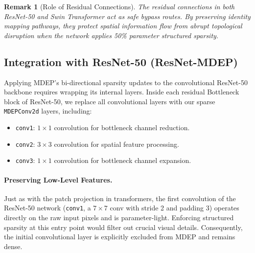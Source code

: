 \documentclass[11pt, a4paper]{article}
\newtheorem{remark}{Remark}
\begin{document}
\begin{remark}[Role of Residual Connections]
The residual connections in both ResNet-50 and Swin Transformer act as safe bypass routes. By preserving identity mapping pathways, they protect spatial information flow from abrupt topological disruption when the network applies 50\% parameter structured sparsity.
\end{remark}

\subsection{Integration with ResNet-50 (ResNet-MDEP)}\label{subsec:resnet}

Applying MDEP's bi-directional sparsity updates to the convolutional ResNet-50 backbone requires wrapping its internal layers. Inside each residual Bottleneck block of ResNet-50, we replace all convolutional layers with our sparse \texttt{MDEPConv2d} layers, including:
\begin{itemize}
    \item \texttt{conv1}: $1 \times 1$ convolution for bottleneck channel reduction.
    \item \texttt{conv2}: $3 \times 3$ convolution for spatial feature processing.
    \item \texttt{conv3}: $1 \times 1$ convolution for bottleneck channel expansion.
\end{itemize}

\paragraph{Preserving Low-Level Features.}
Just as with the patch projection in transformers, the first convolution of the ResNet-50 network (\texttt{conv1}, a $7 \times 7$ conv with stride 2 and padding 3) operates directly on the raw input pixels and is parameter-light. Enforcing structured sparsity at this entry point would filter out crucial visual details. Consequently, the initial convolutional layer is explicitly excluded from MDEP and remains dense.
\end{document}
